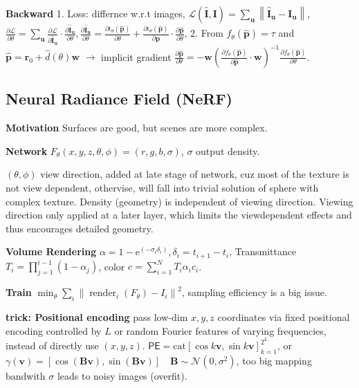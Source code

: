 \textbf{Backward}
1. Loss: differnce w.r.t images, \(\mathcal{L}(\hat{\mathbf{I}}, \mathbf{I})=\sum_{\mathbf{u}}\left\|\hat{\mathbf{I}}_{\mathbf{u}}-\mathbf{I}_{\mathbf{u}}\right\|\),
% 
\(\frac{\partial \mathcal{L}}{\partial \theta}=\sum_{\mathbf{u}} \frac{\partial \mathcal{L}}{\partial \hat{\mathbf{I}}_{\mathbf{u}}} \cdot \frac{\partial \hat{\mathbf{I}}_{\mathbf{u}}}{\partial \theta},
% 
\frac{\partial \hat{\mathbf{I}}_{\mathbf{u}}}{\partial \theta}=\frac{\partial \mathrm{t}_{\theta}(\widehat{\mathbf{p}})}{\partial \theta}+\frac{\partial \mathrm{t}_{\theta}(\widehat{\mathbf{p}})}{\partial \widehat{\mathbf{p}}} \cdot \frac{\partial \widehat{\mathbf{p}}}{\partial \theta}\),
2. From \(f_{\theta}(\widehat{\mathbf{p}})=\tau\) and \(\widehat{\mathbf{p}}=\mathbf{r}_{0}+\hat{d}(\theta) \mathbf{w}\) \(\to\) implicit gradient \(\frac{\partial \widehat{\mathbf{p}}}{\partial \theta}=-\mathbf{w}\left(\frac{\partial f_{\theta}(\widehat{\mathbf{p}})}{\partial \widehat{\mathbf{p}}} \cdot \mathbf{w}\right)^{-1} \frac{\partial f_{\theta}(\widehat{\mathbf{p}})}{\partial \theta}\).


\subsection*{Neural Radiance Field (NeRF)}
\textbf{Motivation} Surfaces are good, but scenes are more complex.

\textbf{Network} \(F_\theta(x,y, z, \theta, \phi) = (r,g,b, \sigma)\), \(\sigma\) output density.

\((\theta, \phi)\) view direction, added at late stage of network, cuz most of the texture is not view dependent, othervise, will fall into trivial solution of sphere with complex texture. Density (geometry) is independent of viewing direction. Viewing direction only applied at a later layer, which limits the viewdependent effects and thus encourages detailed geometry.

\textbf{Volume Rendering}
% 
\(\alpha=1-\mathrm{e}^{\left(-\sigma_{i} \delta_{i}\right)}, \delta_{i}=t_{i+1}-t_{i}\), Transmittance \(T_{i}=\prod_{j=1}^{i-1}\left(1-\alpha_{j}\right)\), color \(c=\sum_{i=1}^{N} {T_{i} \alpha_{i}} c_{i}\).

\textbf{Train} \(\min _{\theta} \sum_{i}\left\|\operatorname{render}_{i}\left(F_{\theta}\right)-I_{i}\right\|^{2}\), sampling efficiency is a big issue.

\textbf{trick: Positional encoding} pass low-dim \(x,y,z\) coordinates via fixed positional encoding controlled by \(L\) or random Fourier features of varying frequencies, instead of directly use \((x,y,z)\). 
% 
\(\mathsf{PE} = \text{cat}[\cos k\mathbf{v}, \sin k\mathbf{v}]_{k=1}^{2^L}\), 
% 
or \(\gamma(\mathbf{v})=[\cos (\mathbf{B v}), \sin (\mathbf{B v})] \quad \mathbf{B} \sim \mathcal{N}\left(0, \sigma^{2}\right)\), too big mapping bandwith  \(\sigma\) leads to noisy images (overfit).

